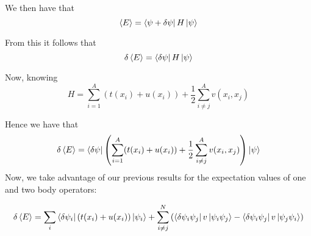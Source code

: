 \documentclass[11pt]{article} %
\begin{document}
We then have that\\

\begin{equation}
\braket{E}=\bra{\psi+\delta\psi}H\ket{\psi}
\end{equation}

From this it follows that \\

\begin{equation}
\delta \braket{E}=\bra{\delta\psi}H\ket{\psi}
\end{equation}

Now, knowing\\

\begin{equation}
H=\sum_{i=1}^A(t(x_i)+u(x_i))+\frac{1}{2} \sum_{i\neq j}^A v(x_i,x_j)
\end{equation}

Hence we have that\\

\begin{equation}
\delta \braket{E}=\bra{\delta\psi}\left(\sum_{i=1}^A(t(x_i)+u(x_i))+\frac{1}{2} \sum_{i\neq j}^A v(x_i,x_j)\right)\ket{\psi}
\end{equation}
Now, we take advantage of our previous results for the expectation values of one and two body operators:

\begin{equation}
\delta \braket{E}=\sum_{i} \bra{\delta\psi_i}\left(t(x_i)+u(x_i)\right)\ket{\psi_i}+\sum_{i\neq j}^N\left( \bra{\delta \psi_i\psi_j}v\ket{\psi_i \psi_j} -\bra{\delta \psi_i\psi_j}v\ket{\psi_j \psi_i}  \right)
\end{equation}
\end{document}
